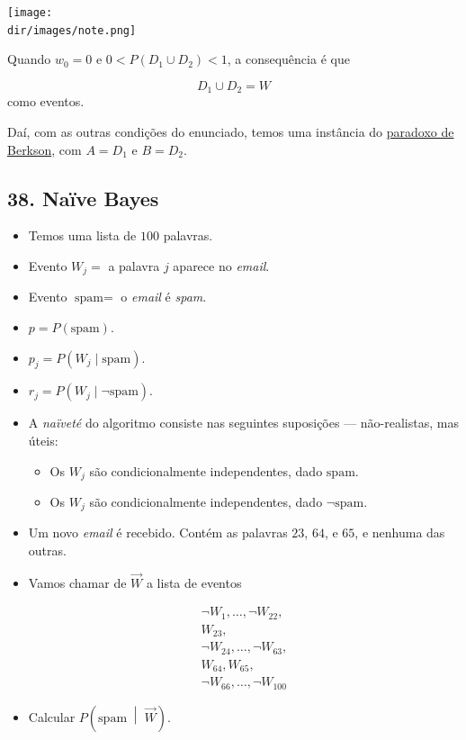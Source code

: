 \documentclass[
  11pt]{report}
\newcommand{\dir}{/ssd/R/x86_64-pc-linux-gnu-library/4.1/fnaufelRmd/rmarkdown/resources}
\newenvironment{rmdnote}
{
  \begin{mynote}
    \texttt{[image: \\dir/images/note.png]}
    \tcblower
  }
  {
  \end{mynote}
}
\begin{document}
\begin{rmdnote}
Quando $w_0 = 0$ e $0 < P(D_1 \cup D_2) < 1$, a consequência é que

\[
D_1 \cup D_2 = W
\]
como eventos.

Daí, com as outras condições do enunciado, temos uma instância do \protect\hyperlink{paradoxo-de-berkson}{paradoxo de Berkson}, com $A = D_1$ e $B = D_2$.

\end{rmdnote}

\hypertarget{nauxefve-bayes}{%
\subsection*{38. Naïve Bayes}\label{nauxefve-bayes}}

\begin{rmdbox}

\begin{itemize}
\item
  Temos uma lista de $100$ palavras.
\item
  Evento $W_j = {}$ a palavra $j$ aparece no \emph{email}.
\item
  Evento $\text{spam} = {}$ o \emph{email} é \emph{spam}.
\item
  $p = P(\text{spam})$.
\item
  $p_j = P(W_j \mid \text{spam})$.
\item
  $r_j = P(W_j \mid \neg \text{spam})$.
\item
  A \emph{naïveté} do algoritmo consiste nas seguintes suposições --- não-realistas, mas úteis:

  \begin{itemize}
  \item
    Os $W_j$ são condicionalmente independentes, dado $\text{spam}$.
  \item
    Os $W_j$ são condicionalmente independentes, dado $\neg \text{spam}$.
  \end{itemize}
\item
  Um novo \emph{email} é recebido. Contém as palavras $23$, $64$, e $65$, e nenhuma das outras.
\item
  Vamos chamar de $\vec W$ a lista de eventos

  \[
  \begin{array}{l}
  \neg W_1, \ldots, \neg W_{22}, \\
  W_{23},\\ 
  \neg W_{24}, \ldots, \neg W_{63},\\    
  W_{64}, W_{65},\\ 
  \neg W_{66}, \ldots, \neg W_{100}
  \end{array}
  \]
\item
  Calcular $P\left( \text{spam} \;\middle|\; \vec W \right)$.
\end{itemize}

\end{rmdbox}
\end{document}
